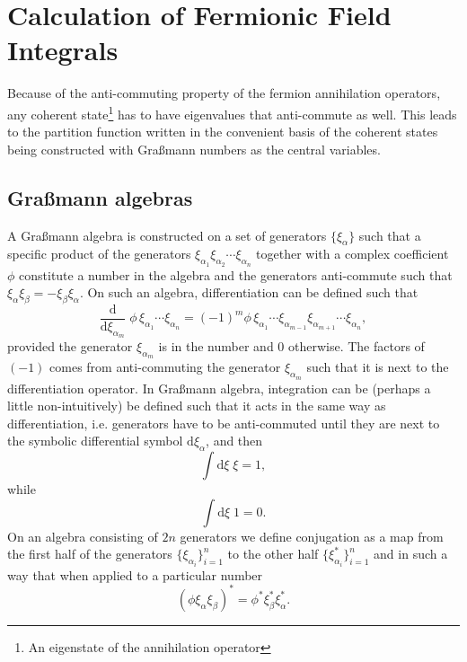 \section{Calculation of Fermionic Field Integrals}

Because of the anti-commuting property of the fermion annihilation operators, any coherent state\footnote{An eigenstate
of the annihilation operator} has to have eigenvalues that anti-commute as well. This leads to the partition function
written in the convenient basis of the coherent states being constructed with Gra\ss mann numbers as the central
variables.

\subsection{Gra\ss mann algebras}
A Gra\ss mann algebra is constructed on a set of generators $\{\xi_\alpha\}$ such that a specific product
of the generators $\xi_{\alpha_1}\xi_{\alpha_2}\cdots\xi_{\alpha_n}$ together with a complex coefficient $\phi$ constitute a
number in the algebra and the generators anti-commute such that $\xi_\alpha\xi_\beta = -\xi_\beta\xi_\alpha$. On such
an algebra, differentiation can be defined such that
\begin{equation}
    \label{eq:Field:Ferm:Grass:diff}
    \frac{\mathrm{d}}{\mathrm{d}\xi_{\alpha_m}}\;\phi\,\xi_{\alpha_1}\cdots\xi_{\alpha_n} = (-1)^m\phi\,\xi_{\alpha_1}\cdots\xi_{\alpha_{m-1}}\xi_{\alpha_{m+1}}\cdots\xi_{\alpha_n},
\end{equation}
provided the generator $\xi_{\alpha_m}$ is in the number and $0$ otherwise. The factors of $(-1)$ comes from anti-commuting
the generator $\xi_{\alpha_m}$ such that it is next to the differentiation operator. In Gra\ss mann algebra, integration
can be (perhaps a little non-intuitively) be defined such that it acts in the same way as differentiation, i.e. generators
have to be anti-commuted until they are next to the symbolic differential symbol $\mathrm{d}\xi_{\alpha}$, and then
\begin{equation}
    \label{eq:Field:Ferm:Grass:int}
    \int\!\mathrm{d}\xi\;\xi = 1,
\end{equation}
while
\begin{equation}
    \label{eq:Field:Ferm:Grass:int2}
    \int\!\mathrm{d}\xi\;1 = 0.
\end{equation}
On an algebra consisting of $2n$ generators we define conjugation as a map from the first half of the generators $\{\xi_{\alpha_i}\}_{i=1}^n$
to the other half $\{\xi_{\alpha_i}^\ast\}_{i=1}^n$ and in such a way that when applied to a particular number
\begin{equation}
    \label{eq:Field:Ferm:Grass:conj}
    (\phi\xi_\alpha\xi_\beta)^\ast = \phi^\ast\xi_\beta^\ast\xi_\alpha^\ast.
\end{equation}

